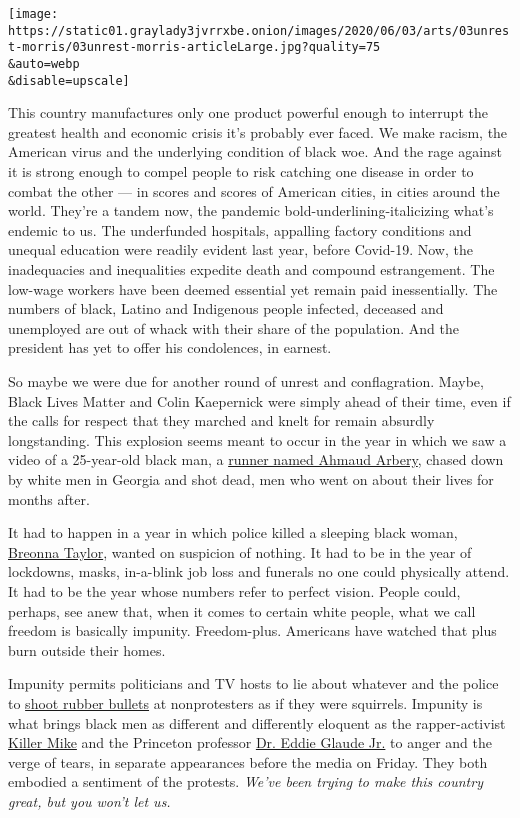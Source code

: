 \texttt{[image: https://static01.graylady3jvrrxbe.onion/images/2020/06/03/arts/03unrest-morris/03unrest-morris-articleLarge.jpg?quality=75\\\&auto=webp\\\&disable=upscale]}

This country manufactures only one product powerful enough to interrupt
the greatest health and economic crisis it's probably ever faced. We
make racism, the American virus and the underlying condition of black
woe. And the rage against it is strong enough to compel people to risk
catching one disease in order to combat the other --- in scores and
scores of American cities, in cities around the world. They're a tandem
now, the pandemic bold-underlining-italicizing what's endemic to us. The
underfunded hospitals, appalling factory conditions and unequal
education were readily evident last year, before Covid-19. Now, the
inadequacies and inequalities expedite death and compound estrangement.
The low-wage workers have been deemed essential yet remain paid
inessentially. The numbers of black, Latino and Indigenous people
infected, deceased and unemployed are out of whack with their share of
the population. And the president has yet to offer his condolences, in
earnest.

So maybe we were due for another round of unrest and conflagration.
Maybe, Black Lives Matter and Colin Kaepernick were simply ahead of
their time, even if the calls for respect that they marched and knelt
for remain absurdly longstanding. This explosion seems meant to occur in
the year in which we saw a video of a 25-year-old black man, a
\href{https://www.nytimes3xbfgragh.onion/article/ahmaud-arbery-shooting-georgia.html}{runner
named Ahmaud Arbery}, chased down by white men in Georgia and shot dead,
men who went on about their lives for months after.

It had to happen in a year in which police killed a sleeping black
woman,
\href{https://www.nytimes3xbfgragh.onion/article/breonna-taylor-police.html}{Breonna
Taylor}, wanted on suspicion of nothing. It had to be in the year of
lockdowns, masks, in-a-blink job loss and funerals no one could
physically attend. It had to be the year whose numbers refer to perfect
vision. People could, perhaps, see anew that, when it comes to certain
white people, what we call freedom is basically impunity. Freedom-plus.
Americans have watched that plus burn outside their homes.

Impunity permits politicians and TV hosts to lie about whatever and the
police to
\href{https://www.nytimes3xbfgragh.onion/2020/05/31/us/police-tactics-floyd-protests.html}{shoot
rubber bullets} at nonprotesters as if they were squirrels. Impunity is
what brings black men as different and differently eloquent as the
rapper-activist
\href{https://www.youtube.com/watch?v=sG0yrng0eY4\&feature=emb_logo}{Killer
Mike} and the Princeton professor
\href{https://www.youtube.com/watch?v=6ylb44LkG9A}{Dr. Eddie Glaude Jr.}
to anger and the verge of tears, in separate appearances before the
media on Friday. They both embodied a sentiment of the protests.
\emph{We've been trying to make this country great, but you won't let
us.}

